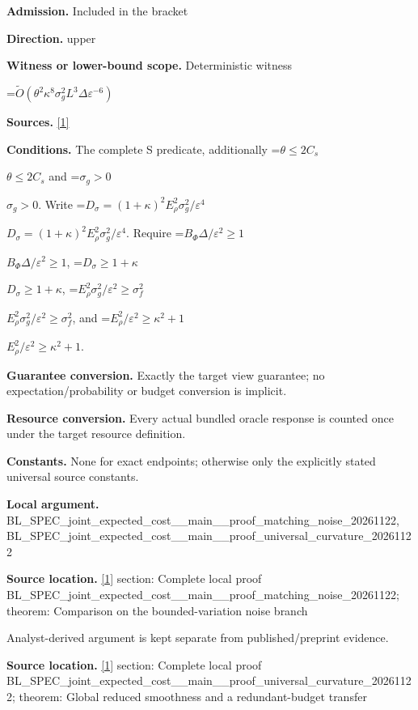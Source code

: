 \documentclass[10pt,a4paper]{article}
\newcommand{\AtlasMath}[1]{\par\begingroup\centering\setbox0=\hbox{$\displaystyle #1$}\ifdim\wd0>1.4\linewidth\typeout{ATLAS WIDE FORMULA: \the\wd0}\fi\ifdim\wd0>\linewidth\resizebox{\linewidth}{!}{\box0}\else\box0\fi\par\endgroup}
\newcommand{\AtlasInlineMath}[1]{\begingroup\setbox0=\hbox{$#1$}\ifdim\wd0>.4\linewidth\endgroup\AtlasMath{#1}\else\endgroup$#1$\fi}
\begin{document}
\textbf{Admission.} Included in the bracket



\textbf{Direction.} upper



\textbf{Witness or lower-bound scope.} Deterministic witness



\AtlasMath{\widetilde O(\theta^2\kappa^8\sigma_g^2L^3\Delta\varepsilon^{-6})}


\textbf{Sources.} \href{https://arxiv.org/pdf/2610.03633v2}{[1]}



\textbf{Conditions.} The complete S predicate, additionally \AtlasInlineMath{\theta\le2C_s} and \AtlasInlineMath{\sigma_g>0}. Write \AtlasInlineMath{D_\sigma=(1+\kappa)^2 E_\rho^2\sigma_g^2/\varepsilon^4}. Require \AtlasInlineMath{B_\Phi\Delta/\varepsilon^2\ge1}, \AtlasInlineMath{D_\sigma\ge1+\kappa}, \AtlasInlineMath{E_\rho^2\sigma_g^2/\varepsilon^2\ge\sigma_f^2}, and \AtlasInlineMath{E_\rho^2/\varepsilon^2\ge\kappa^2+1}.



\textbf{Guarantee conversion.} Exactly the target view guarantee; no expectation/probability or budget conversion is implicit.



\textbf{Resource conversion.} Every actual bundled oracle response is counted once under the target resource definition.



\textbf{Constants.} None for exact endpoints; otherwise only the explicitly stated universal source constants.



\textbf{Local argument.} BL\_SPEC\_joint\_expected\_c\allowbreak{}ost\_\_main\_\_proof\_matchin\allowbreak{}g\_noise\_20261122, BL\_SPEC\_joint\_expected\_c\allowbreak{}ost\_\_main\_\_proof\_univers\allowbreak{}al\_curvature\_20261122



\textbf{Source location.} \href{https://arxiv.org/pdf/2610.03633v2}{[1]} section: Complete local proof BL\_SPEC\_joint\_expected\_c\allowbreak{}ost\_\_main\_\_proof\_matchin\allowbreak{}g\_noise\_20261122; theorem: Comparison on the bounded-variation noise branch



Analyst-derived argument is kept separate from published/preprint evidence.



\textbf{Source location.} \href{https://arxiv.org/pdf/2610.03633v2}{[1]} section: Complete local proof BL\_SPEC\_joint\_expected\_c\allowbreak{}ost\_\_main\_\_proof\_univers\allowbreak{}al\_curvature\_20261122; theorem: Global reduced smoothness and a redundant-budget transfer
\end{document}
